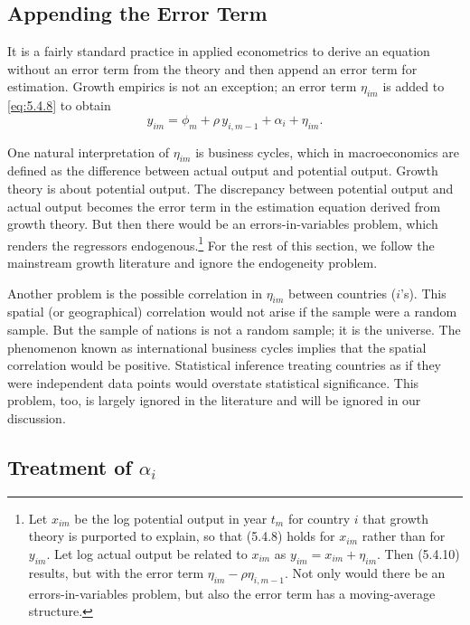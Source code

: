 \subsection*{Appending the Error Term}

It is a fairly standard practice in applied econometrics to derive an equation without
an error term from the theory and then append an error term for estimation. Growth
empirics is not an exception; an error term $\eta_{im}$ is added to \eqref{eq:5.4.8} to obtain
\begin{equation}
  y_{im} = \phi_m + \rho\, y_{i,m-1} + \alpha_i + \eta_{im}.
  \label{eq:5.4.10} \tag{5.4.10}
\end{equation}

One natural interpretation of $\eta_{im}$ is business cycles, which in macroeconomics are
defined as the difference between actual output and potential output. Growth theory
is about potential output. The discrepancy between potential output and actual
output becomes the error term in the estimation equation derived from growth theory.
But then there would be an errors-in-variables problem, which renders
the regressors endogenous.\footnote{Let $x_{im}$ be the log potential output in year $t_m$
for country $i$ that growth theory is purported to explain, so that
(5.4.8) holds for $x_{im}$ rather than for $y_{im}$. Let log actual output be related to
$x_{im}$ as $y_{im} = x_{im} + \eta_{im}$. Then
(5.4.10) results, but with the error term $\eta_{im} - \rho\eta_{i,m-1}$.
Not only would there be an errors-in-variables problem,
but also the error term has a moving-average structure.}
For the rest of this section, we follow the mainstream
growth literature and ignore the endogeneity problem.

Another problem is the possible correlation in $\eta_{im}$ between countries ($i$'s). This
spatial (or geographical) correlation would not arise if the sample were a random
sample. But the sample of nations is not a random sample; it is the universe.
The phenomenon known as international business cycles implies that the spatial
correlation would be positive. Statistical inference treating countries as if they were
independent data points would overstate statistical significance. This problem, too,
is largely ignored in the literature and will be ignored in our discussion.

\subsection*{Treatment of $\alpha_i$}

